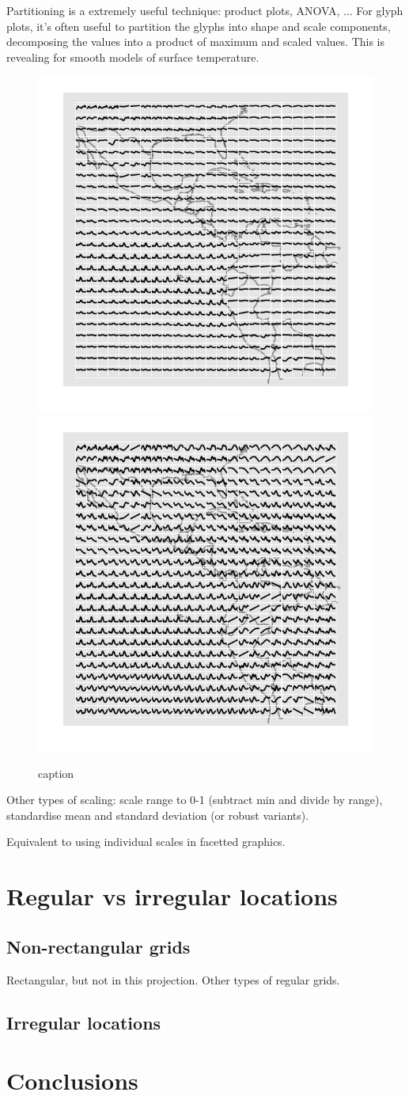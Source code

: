 \documentclass[oneside]{article}
\begin{document}
Partitioning is a extremely useful technique: product plots, ANOVA, ...  For glyph plots, it's often useful to partition the glyphs into shape and scale components, decomposing the values into a product of maximum and scaled values. This is revealing for smooth models of surface temperature.

\begin{figure}[htbp]
  \centering
  \includegraphics[width=0.5\linewidth]{month-rescale-max}%
  \includegraphics[width=0.5\linewidth]{month-rescale01}
  \caption{caption}
  \label{fig:label}
\end{figure}

Other types of scaling: scale range to 0-1 (subtract min and divide by range), standardise mean and standard deviation (or robust variants). 

Equivalent to using individual scales in facetted graphics.


\section{Regular vs irregular locations}

\subsection{Non-rectangular grids}

Rectangular, but not in this projection.  Other types of regular grids.

\subsection{Irregular locations}

\section{Conclusions}


\end{document}
